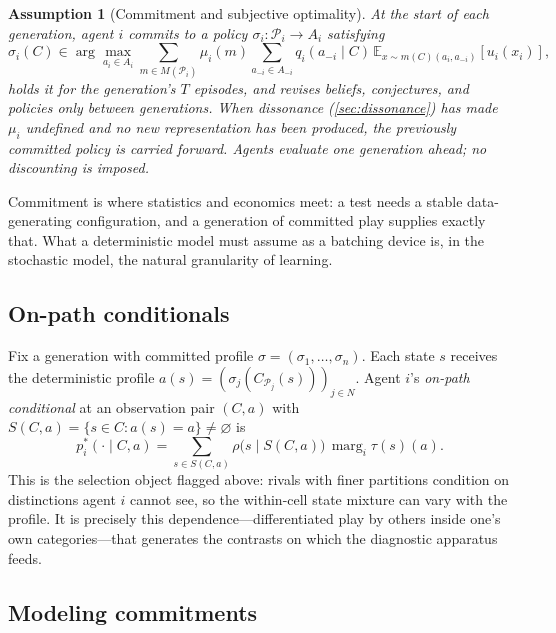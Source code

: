 \documentclass[11pt]{article}
\newtheorem{assumption}{Assumption}[section]
\theoremstyle{definition}
\newcommand{\emptysetset}{\varnothing}
\newcommand{\marg}[1]{\operatorname{marg}_{#1}}
\begin{document}
\begin{assumption}[Commitment and subjective optimality]
\label{ass:commitment}
At the start of each generation, agent $i$ commits to a policy
$\sigma_i:\mathcal P_i\to A_i$ satisfying
\begin{equation}
\sigma_i(C)\in\arg\max_{a_i\in A_i}
\sum_{m\in M(\mathcal P_i)}\mu_i(m)
\sum_{a_{-i}\in A_{-i}}q_i(a_{-i}\mid C)\,
\mathbb E_{x\sim m(C)(a_i,a_{-i})}\!\left[u_i(x_i)\right],
\label{eq:subjective-optimality}
\end{equation}
holds it for the generation's $T$ episodes, and revises beliefs, conjectures,
and policies only between generations.  When dissonance
(\cref{sec:dissonance}) has made $\mu_i$ undefined and no new representation
has been produced, the previously committed policy is carried forward.
Agents evaluate one generation ahead; no discounting is imposed.
\end{assumption}

Commitment is where statistics and economics meet: a test needs a stable
data-generating configuration, and a generation of committed play supplies
exactly that.  What a deterministic model must assume as a batching device
is, in the stochastic model, the natural granularity of learning.

\subsection{On-path conditionals}

Fix a generation with committed profile $\sigma=(\sigma_1,\dots,\sigma_n)$.
Each state $s$ receives the deterministic profile
$a(s)=(\sigma_j(C_{\mathcal P_j}(s)))_{j\in N}$.  Agent $i$'s \emph{on-path
conditional} at an observation pair $(C,a)$ with
$S(C,a)=\{s\in C:a(s)=a\}\neq\emptysetset$ is
\begin{equation}
p_i^{*}(\cdot\mid C,a)
=
\sum_{s\in S(C,a)}\rho\bigl(s\mid S(C,a)\bigr)\,\marg{i}\tau(s)(a).
\label{eq:onpath-conditional}
\end{equation}
This is the selection object flagged above: rivals with finer partitions
condition on distinctions agent $i$ cannot see, so the within-cell state
mixture can vary with the profile.  It is precisely this
dependence---differentiated play by others inside one's own
categories---that generates the contrasts on which the diagnostic apparatus
feeds.

\subsection{Modeling commitments}
\label{sec:commitments}
\end{document}
